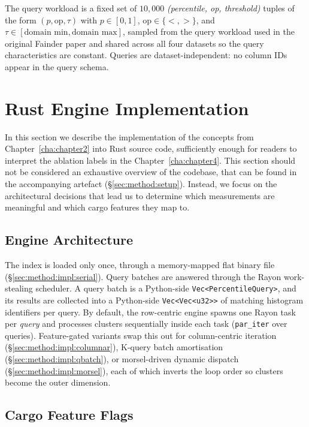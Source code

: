 The query workload is a fixed set of $10{,}000$ \emph{(percentile, op, threshold)} tuples of the form $(p, \text{op}, \tau)$ with $p \in [0,1]$, $\text{op} \in \{<, >\}$, and $\tau \in [\text{domain min}, \text{domain max}]$, sampled from the query workload used in the original Fainder paper and shared across all four datasets so the query characteristics are constant. Queries are dataset-independent: no column IDs appear in the query schema.


\section{Rust Engine Implementation\label{sec:method:impl}}

In this section we describe the implementation of the concepts from Chapter~\ref{cha:chapter2} into Rust source code, sufficiently enough for readers to interpret the ablation labels in the Chapter~\ref{cha:chapter4}. This section should not be considered an exhaustive overview of the codebase, that can be found in the accompanying artefact (§\ref{sec:method:setup}). Instead, we focus on the architectural decisions that lead us to determine which measurements are meaningful and which cargo features they map to.

\subsection{Engine Architecture\label{sec:method:impl:arch}}

The index is loaded only once, through a memory-mapped flat binary file (§\ref{sec:method:impl:serial}). Query batches are answered through the Rayon work-stealing scheduler. A query batch is a Python-side \texttt{Vec<PercentileQuery>}, and its results are collected into a Python-side \texttt{Vec<Vec<u32>>} of matching histogram identifiers per query. By default, the row-centric engine spawns one Rayon task per \emph{query} and processes clusters sequentially inside each task (\texttt{par\_iter} over queries). Feature-gated variants swap this out for column-centric iteration (§\ref{sec:method:impl:columnar}), K-query batch amortisation (§\ref{sec:method:impl:qbatch}), or morsel-driven dynamic dispatch (§\ref{sec:method:impl:morsel}), each of which inverts the loop order so clusters become the outer dimension.

\subsection{Cargo Feature Flags\label{sec:method:cargo}}

